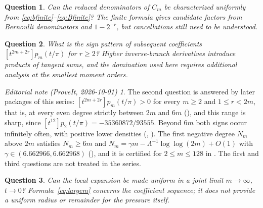 \documentclass[11pt,a4paper]{article}
\newtheorem{question}{Question}
\theoremstyle{remark}\newtheorem*{ednote}{Editorial note (ProveIt, 2026-10-01)}
\begin{document}
\begin{question}
Can the reduced denominators of $C_m$ be characterized uniformly from \eqref{eq:bfinite}--\eqref{eq:Bfinite}? The finite formula gives candidate factors from Bernoulli denominators and $1-2^{-r}$, but cancellations still need to be understood.
\end{question}
\begin{question}
What is the sign pattern of subsequent coefficients $[t^{2m+2r}]p_m(t/\pi)$ for $r\ge2$? Higher inverse-branch derivatives introduce products of tangent sums, and the domination used here requires additional analysis at the smallest moment orders.
\end{question}
\begin{ednote}
The second question is answered by later packages of this series:
$[t^{2m+2r}]p_m(t/\pi)>0$ for every $m\ge2$ and $1\le r<2m$, that is, at every even degree
strictly between $2m$ and $6m$ (), and this range is sharp, since
$[t^{12}]p_2(t/\pi)=-35360872/93555$. Beyond $6m$ both signs occur infinitely often, with
positive lower densities (, ). The
first negative degree $N_m$ above $2m$ satisfies $N_m\ge6m$ and $N_m=\gamma m-\Lambda^{-1}\log\log(2m)+O(1)$ with $\gamma\in(6.662966,6.662968)$ (), and it is certified for $2\le m\le128$ in .
The first and third questions are not treated in the series.
\end{ednote}
\begin{question}
Can the local expansion be made uniform in a joint limit $m\to\infty$, $t\to0$? Formula~\eqref{eq:largem} concerns the coefficient sequence; it does not provide a uniform radius or remainder for the pressure itself.
\end{question}
\end{document}
